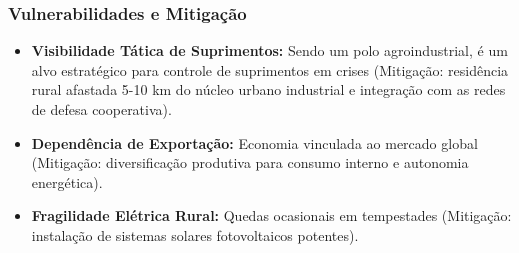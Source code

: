 \subsubsection{Vulnerabilidades e
Mitigação}

\begin{itemize}
\tightlist
\item
  \textbf{Visibilidade Tática de Suprimentos:} Sendo um polo
  agroindustrial, é um alvo estratégico para controle de suprimentos em
  crises (Mitigação: residência rural afastada 5-10 km do núcleo urbano
  industrial e integração com as redes de defesa cooperativa).
\item
  \textbf{Dependência de Exportação:} Economia vinculada ao mercado
  global (Mitigação: diversificação produtiva para consumo interno e
  autonomia energética).
\item
  \textbf{Fragilidade Elétrica Rural:} Quedas ocasionais em tempestades
  (Mitigação: instalação de sistemas solares fotovoltaicos potentes).
\end{itemize}

